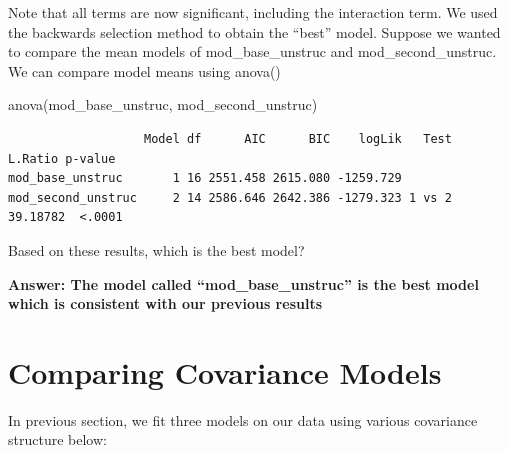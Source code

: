 \documentclass[
  letterpaper,
  DIV=11,
  numbers=noendperiod]{scrreprt}
\newenvironment{Shaded}{\begin{snugshade}}{\end{snugshade}}
\newcommand{\FunctionTok}[1]{\textcolor[rgb]{0.28,0.35,0.67}{#1}}
\newcommand{\NormalTok}[1]{\textcolor[rgb]{0.00,0.23,0.31}{#1}}
\begin{document}
Note that all terms are now significant, including the interaction term.
We used the backwards selection method to obtain the ``best'' model.
Suppose we wanted to compare the mean models of mod\_base\_unstruc and
mod\_second\_unstruc. We can compare model means using anova()

\begin{Shaded}
\begin{Highlighting}[]
\FunctionTok{anova}\NormalTok{(mod\_base\_unstruc, mod\_second\_unstruc)}
\end{Highlighting}
\end{Shaded}

\begin{verbatim}
                   Model df      AIC      BIC    logLik   Test  L.Ratio p-value
mod_base_unstruc       1 16 2551.458 2615.080 -1259.729                        
mod_second_unstruc     2 14 2586.646 2642.386 -1279.323 1 vs 2 39.18782  <.0001
\end{verbatim}

Based on these results, which is the best model?

\textbf{Answer: The model called ``mod\_base\_unstruc'' is the best
model which is consistent with our previous results}

\hypertarget{comparing-covariance-models}{%
\section{Comparing Covariance
Models}\label{comparing-covariance-models}}

In previous section, we fit three models on our data using various
covariance structure below:
\end{document}
